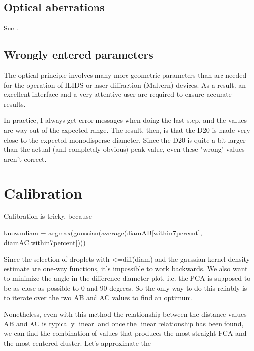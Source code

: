 \documentclass[11.5pt]{book}
\begin{document}
\subsection{Optical aberrations}
See \citet{Dressler90}.

\subsection{Wrongly entered parameters}
The optical principle involves many more geometric parameters than are needed
for the operation of ILIDS or laser diffraction (Malvern) devices. As a result, an
excellent interface and a very attentive user are required to ensure accurate
results.

In practice, I always get error messages when doing the last step, and the
values are way out of the expected range. The result, then, is that the D20 is
made very close to the expected monodisperse diameter. Since the D20 is quite
a bit larger than the actual (and completely obvious) peak value, even these
"wrong" values aren't correct.

\section{Calibration}
Calibration is tricky, because 

knowndiam = argmax(gaussian(average(diamAB[within7percent], diamAC[within7percent])))

Since the selection of droplets with <=diff(diam) and the gaussian kernel
density estimate are one-way functions, it's impossible to work backwards. We
also want to minimize the angle in the difference-diameter plot, i.e. the PCA is
supposed to be as close as possible to 0 and 90 degrees. So the only way to do
this reliably is to iterate over the two AB and AC values to find an optimum.

Nonetheless, even with this method the relationship between the distance values
AB and AC is typically linear, and once the linear relationship has been found,
we can find the combination of values that produces the most straight PCA and
the most centered cluster. Let's approximate the 
\end{document}
